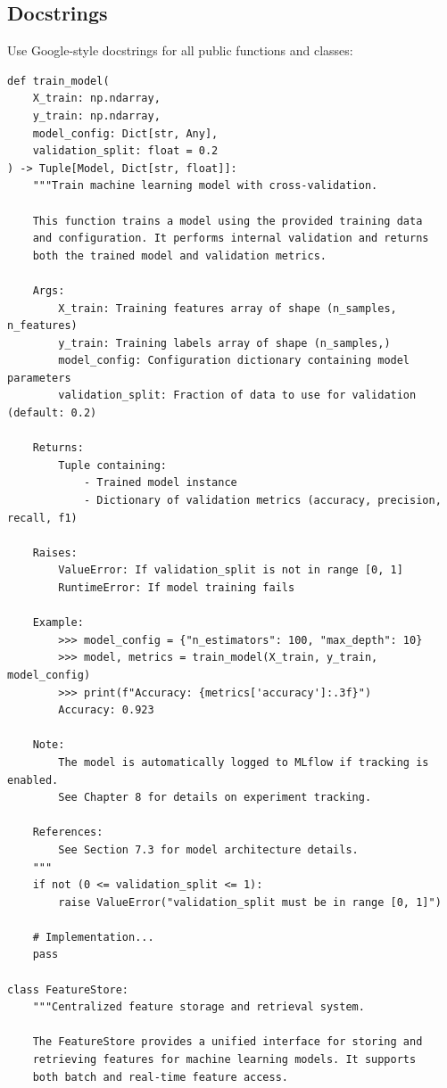 \subsection{Docstrings}

Use Google-style docstrings for all public functions and classes:

\begin{lstlisting}[style=python, caption=Docstring Examples]
def train_model(
    X_train: np.ndarray,
    y_train: np.ndarray,
    model_config: Dict[str, Any],
    validation_split: float = 0.2
) -> Tuple[Model, Dict[str, float]]:
    """Train machine learning model with cross-validation.

    This function trains a model using the provided training data
    and configuration. It performs internal validation and returns
    both the trained model and validation metrics.

    Args:
        X_train: Training features array of shape (n_samples, n_features)
        y_train: Training labels array of shape (n_samples,)
        model_config: Configuration dictionary containing model parameters
        validation_split: Fraction of data to use for validation (default: 0.2)

    Returns:
        Tuple containing:
            - Trained model instance
            - Dictionary of validation metrics (accuracy, precision, recall, f1)

    Raises:
        ValueError: If validation_split is not in range [0, 1]
        RuntimeError: If model training fails

    Example:
        >>> model_config = {"n_estimators": 100, "max_depth": 10}
        >>> model, metrics = train_model(X_train, y_train, model_config)
        >>> print(f"Accuracy: {metrics['accuracy']:.3f}")
        Accuracy: 0.923

    Note:
        The model is automatically logged to MLflow if tracking is enabled.
        See Chapter 8 for details on experiment tracking.

    References:
        See Section 7.3 for model architecture details.
    """
    if not (0 <= validation_split <= 1):
        raise ValueError("validation_split must be in range [0, 1]")

    # Implementation...
    pass

class FeatureStore:
    """Centralized feature storage and retrieval system.

    The FeatureStore provides a unified interface for storing and
    retrieving features for machine learning models. It supports
    both batch and real-time feature access.


\end{lstlisting}
